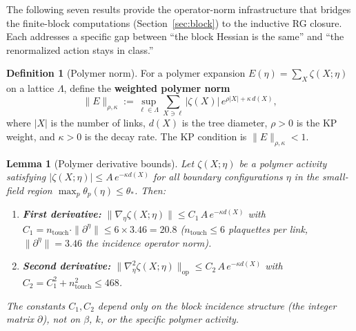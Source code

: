 \documentclass[11pt]{article}
\newtheorem{lemma}[theorem]{Lemma}
\theoremstyle{definition}
\newtheorem{definition}[theorem]{Definition}
\begin{document}
The following seven results provide the operator-norm
infrastructure that bridges the finite-block computations
(Section~\ref{sec:block}) to the inductive RG closure.
Each addresses a specific gap between ``the block Hessian is
the same'' and ``the renormalized action stays in class.''

\begin{definition}[Polymer norm]\label{def:polymer-norm}
For a polymer expansion $E(\eta)=\sum_X\zeta(X;\eta)$
on a lattice $\Lambda$, define the \textbf{weighted polymer norm}
\begin{equation}\label{eq:polymer-norm}
\|E\|_{\rho,\kappa}
:=\sup_{\ell\in\Lambda}\sum_{X\ni\ell}
|\zeta(X)|\,e^{\rho|X|+\kappa\,d(X)},
\end{equation}
where $|X|$ is the number of links, $d(X)$ is the tree diameter,
$\rho>0$ is the KP weight, and $\kappa>0$ is the decay rate.
The KP condition is $\|E\|_{\rho,\kappa}<1$.
\end{definition}

\begin{lemma}[Polymer derivative bounds]%
\label{lem:polymer-deriv}
Let $\zeta(X;\eta)$ be a polymer activity satisfying
$|\zeta(X;\eta)|\le A\,e^{-\kappa d(X)}$ for all boundary
configurations $\eta$ in the small-field region
$\max_p\theta_p(\eta)\le\theta_*$.  Then:
\begin{enumerate}[nosep,label=\textup{(\roman*)}]
\item \textbf{First derivative:}
$\|\nabla_\eta\zeta(X;\eta)\|
\le C_1\,A\,e^{-\kappa d(X)}$
with $C_1=n_{\mathrm{touch}}\cdot\|\partial^\eta\|
\le 6\times 3.46=20.8$
\textup{(}$n_{\mathrm{touch}}\le 6$ plaquettes per link,
$\|\partial^\eta\|=3.46$ the incidence operator norm\textup{)}.
\item \textbf{Second derivative:}
$\|\nabla_\eta^2\zeta(X;\eta)\|_{\mathrm{op}}
\le C_2\,A\,e^{-\kappa d(X)}$
with $C_2=C_1^2+n_{\mathrm{touch}}^2\le 468$.
\end{enumerate}
The constants $C_1,C_2$ depend only on the block incidence
structure \textup{(}the integer matrix $\partial$\textup{)},
not on $\beta$, $k$, or the specific polymer activity.
\end{lemma}
\end{document}
